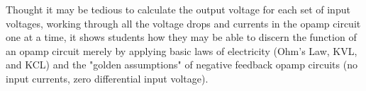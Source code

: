 





Thought it may be tedious to calculate the output voltage for each set of input voltages, working through all the voltage drops and currents in the opamp circuit one at a time, it shows students how they may be able to discern the function of an opamp circuit merely by applying basic laws of electricity (Ohm's Law, KVL, and KCL) and the "golden assumptions" of negative feedback opamp circuits (no input currents, zero differential input voltage).




